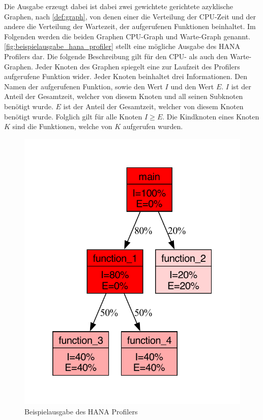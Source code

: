 Die Ausgabe erzeugt dabei ist dabei zwei gewichtete gerichtete azyklische
Graphen, nach \autoref{def:graph}, von denen einer die Verteilung der CPU-Zeit und der andere die
Verteilung der Wartezeit, der aufgerufenen Funktionen beinhaltet. Im Folgenden
werden die beiden Graphen CPU-Graph und Warte-Graph genannt.
\autoref{fig:beispielausgabe_hana_profiler} stellt eine mögliche Ausgabe des
HANA Profilers dar. Die folgende Beschreibung gilt für den CPU- als auch den
Warte-Graphen. Jeder Knoten des Graphen spiegelt eine zur Laufzeit des
Profilers aufgerufene Funktion wider. Jeder Knoten beinhaltet drei
Informationen. Den Namen der aufgerufenen Funktion, sowie den Wert $I$ und den
Wert $E$. $I$ ist der Anteil der Gesamtzeit, welcher von diesem Knoten und all
seinen Subknoten benötigt wurde. $E$ ist der Anteil der Gesamtzeit, welcher
von diesem Knoten benötigt wurde. Folglich gilt für alle Knoten $I\geq E$.
Die Kindknoten eines Knoten $K$ sind die Funktionen, welche von $K$ aufgerufen
wurden.
\begin{figure}[h]
    \begin{center}
        \includegraphics[page=1]{Bilder/pdf/profiler_output_example.pdf}
    \end{center}
    \caption{Beispielausgabe des HANA Profilers}\label{fig:beispielausgabe_hana_profiler}
\end{figure}

